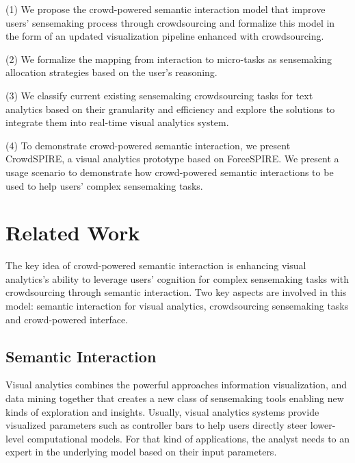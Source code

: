 \documentclass[journal]{vgtc}                %
\begin{document}
(1) We propose the crowd-powered semantic interaction model that improve users' sensemaking process through crowdsourcing and formalize this model in the form of an updated visualization pipeline enhanced with crowdsourcing.

(2) We formalize the mapping from interaction to micro-tasks as sensemaking allocation strategies based on the user’s reasoning.

(3) We classify current existing sensemaking crowdsourcing tasks for text analytics based on their granularity and efficiency and explore the solutions to integrate them into real-time visual analytics system.

(4) To demonstrate crowd-powered semantic interaction, we present CrowdSPIRE, a visual analytics prototype based on ForceSPIRE. We present a usage scenario to demonstrate how crowd-powered semantic interactions to be used to help users' complex sensemaking tasks.



\section{Related Work}

The key idea of crowd-powered semantic interaction is enhancing visual analytics's ability to leverage users' cognition for complex sensemaking tasks with crowdsourcing through semantic interaction. Two key aspects are involved in this model: semantic interaction for visual analytics, crowdsourcing sensemaking tasks and crowd-powered interface.

\subsection{Semantic Interaction}



Visual analytics\cite{Thomas2005} combines the powerful approaches information visualization, and data mining together that creates a new class of sensemaking tools enabling new kinds of exploration and insights. Usually, visual analytics systems provide visualized parameters such as controller bars\cite{Jeong:2009gc} to help users directly steer lower-level computational models. For that kind of applications, the analyst needs to an expert in the underlying model based on their input parameters.
\end{document}
